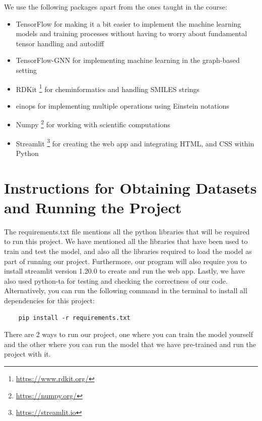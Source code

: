 \documentclass[fontsize=11pt]{article}
\begin{document}
We use the following packages apart from the ones taught in the course:
\begin{itemize}
    \item TensorFlow \citep{abadi2016tensorflow} for making it a bit easier to implement the machine learning models and training processes without having to worry about fundamental tensor handling and autodiff
    \item TensorFlow-GNN \citep{ferludin2022tf} for implementing machine learning in the graph-based setting
    \item RDKit \footnote{\url{https://www.rdkit.org/}} for cheminformatics and handling SMILES strings
    \item einops \citep{rogozhnikov2022einops} for implementing multiple operations using Einstein notations
    \item Numpy \footnote{\url{https://numpy.org/}} for working with scientific computations
    \item Streamlit \footnote{\url{https://streamlit.io}} for creating the web app and integrating HTML, and CSS within Python
\end{itemize}

\section*{Instructions for Obtaining Datasets and Running the Project}

The requirements.txt file mentions all the python libraries that will be required to run this project. We have mentioned all the libraries that have been used to train and test the model, and also all the libraries required to load the model as part of running our project. Furthermore, our program will also require you to install streamlit version 1.20.0 to create and run the web app. Lastly, we have also used python-ta for testing and checking the correctness of our code. Alternatively, you can run the following command in the terminal to install all dependencies for this project:

\begin{verbatim}
    pip install -r requirements.txt
\end{verbatim}

There are 2 ways to run our project, one where you can train the model yourself and the other where you can run the model that we have pre-trained and run the project with it.
\end{document}
